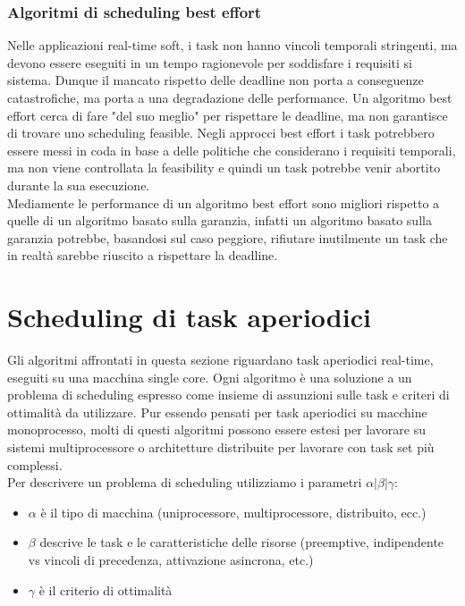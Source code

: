 \documentclass[12pt]{article}
\begin{document}
\subsubsection{Algoritmi di scheduling best effort}
Nelle applicazioni real-time soft, i task non hanno vincoli temporali stringenti, ma devono essere eseguiti in un tempo ragionevole per soddisfare i requisiti si sistema.
Dunque il mancato rispetto delle deadline non porta a conseguenze catastrofiche, ma porta a una degradazione delle performance.
Un algoritmo best effort cerca di fare "del suo meglio" per rispettare le deadline, ma non garantisce di trovare uno scheduling feasible.
Negli approcci best effort i task potrebbero essere messi in coda in base a delle politiche che considerano i requisiti temporali, ma non viene controllata la feasibility e quindi un task potrebbe venir abortito durante la sua esecuzione.\\
Mediamente le performance di un algoritmo best effort sono migliori rispetto a quelle di un algoritmo basato sulla garanzia, infatti un algoritmo basato sulla garanzia
potrebbe, basandosi sul caso peggiore, rifiutare inutilmente un task che in realtà sarebbe riuscito a rispettare la deadline.

\section{Scheduling di task aperiodici}
Gli algoritmi affrontati in questa sezione riguardano task aperiodici real-time, eseguiti su una macchina single core.
Ogni algoritmo è una soluzione a un problema di scheduling espresso come insieme di assunzioni sulle task e criteri di ottimalità da utilizzare.
Pur essendo pensati per task aperiodici su macchine monoprocesso, molti di questi algoritmi possono essere estesi per lavorare su sistemi multiprocessore o architetture distribuite per lavorare con task set più complessi.
\\
Per descrivere un problema di scheduling utilizziamo i parametri $\alpha|\beta|\gamma$:
\begin{itemize}
\item $\alpha$ è il tipo di macchina (uniprocessore, multiprocessore, distribuito, ecc.)
\item $\beta$ descrive le task e le caratteristiche delle risorse (preemptive, indipendente vs vincoli di precedenza, attivazione asincrona, etc.)
\item $\gamma$ è il criterio di ottimalità
\end{itemize}
\end{document}

